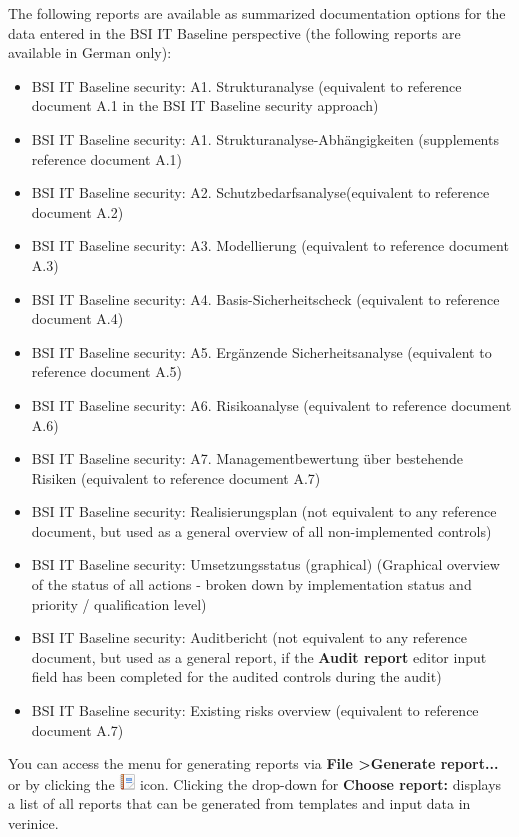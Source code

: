 \documentclass[a4paper,10pt]{book}
\begin{document}
 The following reports are available as summarized documentation options for the data entered in the
 BSI IT Baseline perspective (the following reports are available in German only):
 \begin{itemize}
 \item BSI IT Baseline security: A1. Strukturanalyse (equivalent to reference document A.1 in the BSI IT Baseline security approach)
 \item BSI IT Baseline security: A1. Strukturanalyse-Abhängigkeiten (supplements reference document A.1)
 \item BSI IT Baseline security: A2. Schutzbedarfsanalyse(equivalent to reference document A.2)
 \item BSI IT Baseline security: A3. Modellierung (equivalent to reference document A.3)
 \item BSI IT Baseline security: A4. Basis-Sicherheitscheck (equivalent to reference document A.4)
 \item BSI IT Baseline security: A5. Ergänzende Sicherheitsanalyse (equivalent to reference document A.5)
 \item BSI IT Baseline security: A6. Risikoanalyse (equivalent to reference document A.6)
 \item BSI IT Baseline security: A7. Managementbewertung über bestehende Risiken (equivalent to reference document A.7)
 \item BSI IT Baseline security: Realisierungsplan (not equivalent to any reference document, but used as a general overview of all non-implemented controls)
 \item BSI IT Baseline security: Umsetzungsstatus (graphical) (Graphical overview of the status of all actions - broken down by implementation status and priority / qualification level)
 \item BSI IT Baseline security: Auditbericht (not equivalent to any reference document, but used as a general report, if the \textbf{Audit report} editor input field has been completed for the audited controls during the audit)
 \item BSI IT Baseline security: Existing risks overview (equivalent to reference document A.7)
 \end{itemize}
 You can access the menu for generating reports via \textbf{File \textgreater Generate report...}
 or by clicking the \includegraphics[height=2ex]{Icon/Report.png} icon. Clicking the drop-down for
 \textbf{Choose report:} displays a list of all reports that can be generated from templates and input data in verinice.
\end{document}
